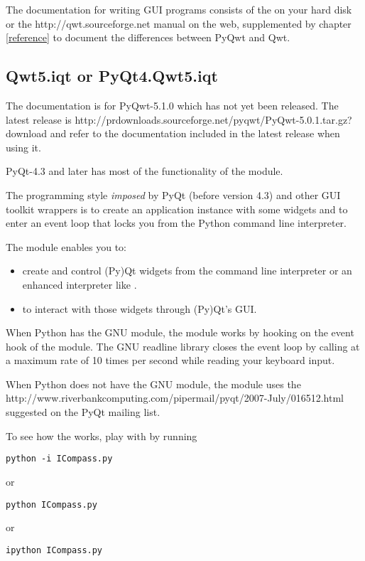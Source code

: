 \documentclass{manual}
\newcommand{\Qwt}{\ulink{Qwt}
  {http://qwt.sourceforge.net}}
\newcommand{\PyQwtLatestTarGz}{\ulink{PyQwt-5.0.1.tar.gz}
  {http://prdownloads.sourceforge.net/pyqwt/PyQwt-5.0.1.tar.gz?download}}
\newcommand{\Future}{
  \begin{notice}[warning]
    The documentation is for PyQwt-5.1.0 which has not yet been released. The
    latest release is \PyQwtLatestTarGz{} and refer to the documentation
    included in the latest release when using it.
  \end{notice}
}
\begin{document}
The documentation for writing GUI programs consists of the
 on your hard disk or the \Qwt{} manual on
the web, supplemented by chapter \ref{reference} to document the differences
between PyQwt and Qwt.


\subsection{Qwt5.iqt or PyQt4.Qwt5.iqt
  \label{iqt-intro}}

\Future{}

\begin{notice}[note]
  PyQt-4.3 and later has most of the functionality of the 
  module.
\end{notice}

The programming style \emph{imposed} by PyQt (before version 4.3) and other
GUI toolkit wrappers is to create an application instance with some widgets
and to enter an event loop that locks you from the Python command line
interpreter.

The  module enables you to:
\begin{itemize}
\item
  create and control (Py)Qt widgets from the command line interpreter or an
  enhanced interpreter like .
\item
  to interact with those widgets through (Py)Qt's GUI.
\end{itemize}

When Python has the GNU  module, the  module
works by hooking  on the event hook of the
 module. The GNU readline library closes the event loop by
calling   at a maximum rate of 10 times per
second while reading your keyboard input.

When Python does not have the GNU  module, the 
module uses the
{
  {http://www.riverbankcomputing.com/pipermail/pyqt/2007-July/016512.html}}
suggested on the PyQt mailing list.

To see how the  works, play with  by running
\begin{verbatim}
python -i ICompass.py
\end{verbatim}
or
\begin{verbatim}
python ICompass.py
\end{verbatim}
or
\begin{verbatim}
ipython ICompass.py
\end{verbatim}
\end{document}
